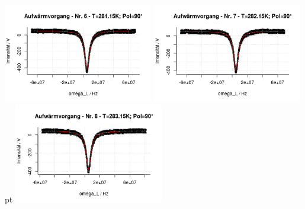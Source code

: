 \documentclass[12pt]{article}
\begin{document}
\begin{minipage}[h!]{\textwidth}
	\includegraphics[width=0.49\textwidth]{figures/warm90-6.png}\vskip -10pt
	\includegraphics[width=0.49\textwidth]{figures/warm90-7.png} pt
	\includegraphics[width=0.49\textwidth]{figures/warm90-8.png}\vskip -10pt
\end{minipage}
\end{document}
